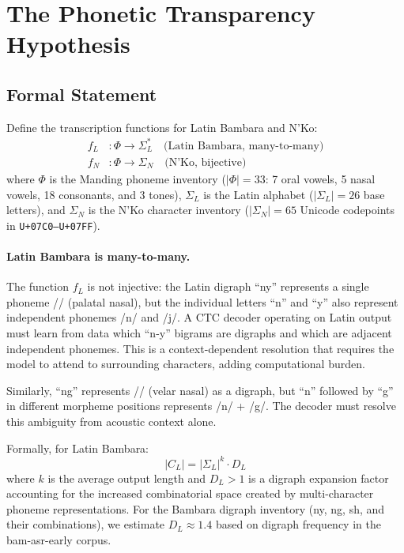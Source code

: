 \documentclass[11pt]{article}
\begin{document}
\section{The Phonetic Transparency Hypothesis}
\label{sec:hypothesis}

\subsection{Formal Statement}

Define the transcription functions for Latin Bambara and N'Ko:
\begin{align}
f_L &: \Phi \to \Sigma_L^* \quad \text{(Latin Bambara, many-to-many)} \\
f_N &: \Phi \to \Sigma_N \quad \text{(N'Ko, bijective)}
\end{align}
where $\Phi$ is the Manding phoneme inventory ($|\Phi| = 33$: 7 oral vowels, 5 nasal vowels, 18 consonants, and 3 tones), $\Sigma_L$ is the Latin alphabet ($|\Sigma_L| = 26$ base letters), and $\Sigma_N$ is the N'Ko character inventory ($|\Sigma_N| = 65$ Unicode codepoints in \texttt{U+07C0--U+07FF}).

\paragraph{Latin Bambara is many-to-many.}
The function $f_L$ is not injective: the Latin digraph ``ny'' represents a single phoneme /\textit{}/ (palatal nasal), but the individual letters ``n'' and ``y'' also represent independent phonemes /n/ and /j/.
A CTC decoder operating on Latin output must learn from data which ``n-y'' bigrams are digraphs and which are adjacent independent phonemes.
This is a context-dependent resolution that requires the model to attend to surrounding characters, adding computational burden.

Similarly, ``ng'' represents // (velar nasal) as a digraph, but ``n'' followed by ``g'' in different morpheme positions represents /n/ + /g/.
The decoder must resolve this ambiguity from acoustic context alone.

Formally, for Latin Bambara:
\begin{equation}
|C_L| = |\Sigma_L|^k \cdot D_L
\end{equation}
where $k$ is the average output length and $D_L > 1$ is a digraph expansion factor accounting for the increased combinatorial space created by multi-character phoneme representations.
For the Bambara digraph inventory (ny, ng, sh, and their combinations), we estimate $D_L \approx 1.4$ based on digraph frequency in the bam-asr-early corpus.
\end{document}
